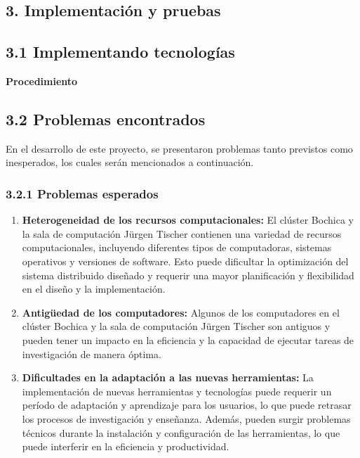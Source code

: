 \begin{doublespace}
\begin{tightcenter}
\section{3. Implementación y pruebas}
\mylinespacing
\end{tightcenter}

\begin{multicols}{2}
    \subsection{3.1 Implementando tecnologías}

\textbf{Procedimiento}

\subsection{3.2 Problemas encontrados}
En el desarrollo de este proyecto, se presentaron problemas tanto previstos como inesperados, los cuales serán mencionados a continuación.

\subsubsection{3.2.1 Problemas esperados}

\begin{enumerate}
    \item \textbf{Heterogeneidad de los recursos computacionales:} El clúster Bochica y la sala de computación Jürgen Tischer contienen una variedad de recursos computacionales, incluyendo diferentes tipos de computadoras, sistemas operativos y versiones de software. Esto puede dificultar la optimización del sistema distribuido diseñado y requerir una mayor planificación y flexibilidad en el diseño y la implementación.
    \item \textbf{Antigüedad de los computadores:} Algunos de los computadores en el clúster Bochica y la sala de computación Jürgen Tischer son antiguos y pueden tener un impacto en la eficiencia y la capacidad de ejecutar tareas de investigación de manera óptima.
    \item \textbf{Dificultades en la adaptación a las nuevas herramientas:} La implementación de nuevas herramientas y tecnologías puede requerir un período de adaptación y aprendizaje para los usuarios, lo que puede retrasar los procesos de investigación y enseñanza. Además, pueden surgir problemas técnicos durante la instalación y configuración de las herramientas, lo que puede interferir en la eficiencia y productividad.
\end{enumerate}


\end{multicols}
\end{doublespace}
